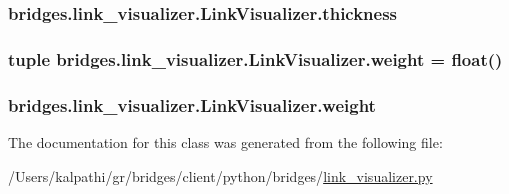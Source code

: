 \subsubsection[{thickness}]{\setlength{\rightskip}{0pt plus 5cm}bridges.\+link\+\_\+visualizer.\+Link\+Visualizer.\+thickness}\label{classbridges_1_1link__visualizer_1_1_link_visualizer_ae7e964f66a674b68801e0b37304de19e}
\hypertarget{classbridges_1_1link__visualizer_1_1_link_visualizer_a58ffed15d53e1f7c2414436f9d063b80}{}
\subsubsection[{weight}]{\setlength{\rightskip}{0pt plus 5cm}tuple bridges.\+link\+\_\+visualizer.\+Link\+Visualizer.\+weight = float()\hspace{0.3cm}{\ttfamily [static]}}\label{classbridges_1_1link__visualizer_1_1_link_visualizer_a58ffed15d53e1f7c2414436f9d063b80}
\hypertarget{classbridges_1_1link__visualizer_1_1_link_visualizer_ad53c209a7b8a7ad5b3d441a198f7a068}{}
\subsubsection[{weight}]{\setlength{\rightskip}{0pt plus 5cm}bridges.\+link\+\_\+visualizer.\+Link\+Visualizer.\+weight}\label{classbridges_1_1link__visualizer_1_1_link_visualizer_ad53c209a7b8a7ad5b3d441a198f7a068}


The documentation for this class was generated from the following file\+:\begin{DoxyCompactItemize}
\item 
/\+Users/kalpathi/gr/bridges/client/python/bridges/\hyperlink{link__visualizer_8py}{link\+\_\+visualizer.\+py}\end{DoxyCompactItemize}
